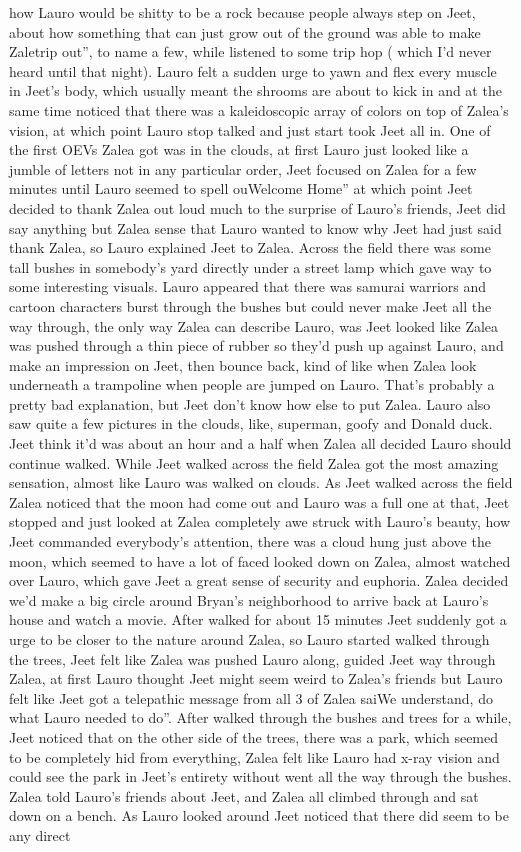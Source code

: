\documentclass[12pt]{book}
\begin{document}
how Lauro would be shitty to be a rock because people always step on Jeet, about how something that can just grow out of the ground was able to make Zaletrip out'', to name a few, while listened to some trip hop ( which I'd never heard until that night). Lauro felt a sudden urge to yawn and flex every muscle in Jeet's body, which usually meant the shrooms are about to kick in and at the same time noticed that there was a kaleidoscopic array of colors on top of Zalea's vision, at which point Lauro stop talked and just start took Jeet all in. One of the first OEVs Zalea got was in the clouds, at first Lauro just looked like a jumble of letters not in any particular order, Jeet focused on Zalea for a few minutes until Lauro seemed to spell ouWelcome Home'' at which point Jeet decided to thank Zalea out loud much to the surprise of Lauro's friends, Jeet did say anything but Zalea sense that Lauro wanted to know why Jeet had just said thank Zalea, so Lauro explained Jeet to Zalea. Across the field there was some tall bushes in somebody's yard directly under a street lamp which gave way to some interesting visuals. Lauro appeared that there was samurai warriors and cartoon characters burst through the bushes but could never make Jeet all the way through, the only way Zalea can describe Lauro, was Jeet looked like Zalea was pushed through a thin piece of rubber so they'd push up against Lauro, and make an impression on Jeet, then bounce back, kind of like when Zalea look underneath a trampoline when people are jumped on Lauro. That's probably a pretty bad explanation, but Jeet don't know how else to put Zalea. Lauro also saw quite a few pictures in the clouds, like, superman, goofy and Donald duck. Jeet think it'd was about an hour and a half when Zalea all decided Lauro should continue walked. While Jeet walked across the field Zalea got the most amazing sensation, almost like Lauro was walked on clouds. As Jeet walked across the field Zalea noticed that the moon had come out and Lauro was a full one at that, Jeet stopped and just looked at Zalea completely awe struck with Lauro's beauty, how Jeet commanded everybody's attention, there was a cloud hung just above the moon, which seemed to have a lot of faced looked down on Zalea, almost watched over Lauro, which gave Jeet a great sense of security and euphoria. Zalea decided we'd make a big circle around Bryan's neighborhood to arrive back at Lauro's house and watch a movie. After walked for about 15 minutes Jeet suddenly got a urge to be closer to the nature around Zalea, so Lauro started walked through the trees, Jeet felt like Zalea was pushed Lauro along, guided Jeet way through Zalea, at first Lauro thought Jeet might seem weird to Zalea's friends but Lauro felt like Jeet got a telepathic message from all 3 of Zalea saiWe understand, do what Lauro needed to do''. After walked through the bushes and trees for a while, Jeet noticed that on the other side of the trees, there was a park, which seemed to be completely hid from everything, Zalea felt like Lauro had x-ray vision and could see the park in Jeet's entirety without went all the way through the bushes. Zalea told Lauro's friends about Jeet, and Zalea all climbed through and sat down on a bench. As Lauro looked around Jeet noticed that there did seem to be any direct 
\end{document}
